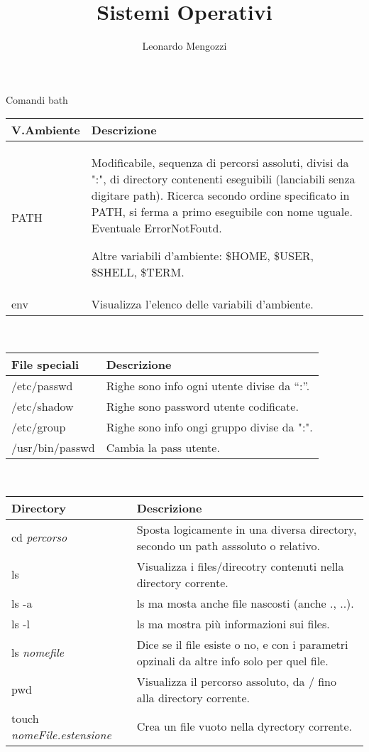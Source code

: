 \documentclass{article}
\title{Sistemi Operativi}
\author{Leonardo Mengozzi}
\date{}
\newcommand{\riga}[2]{
	#1 & #2\\
}
\newcommand{\tabella}[2]{
	\begin{tabularx}{\textwidth}{lX}
		\hline
		#1 & Descrizione\\
		\hline
		#2
		\hline
	\end{tabularx}
	\\[0.03\textheight]
}
\begin{document}
	\maketitle

	\centering
	{\large Comandi bath}\\[0.01\textheight]

	\tabella{V.Ambiente}{
		\riga{PATH}{Modificabile, sequenza di percorsi assoluti, divisi da ":", di directory contenenti eseguibili (lanciabili senza digitare path). Ricerca secondo ordine specificato in PATH, si ferma a primo eseguibile con nome uguale. Eventuale ErrorNotFoutd.

		Altre variabili d'ambiente: \$HOME, \$USER, \$SHELL, \$TERM.}
		\riga{env}{Visualizza l'elenco delle variabili d'ambiente.}
	}

	\tabella{File speciali}{
		\riga{/etc/passwd}{Righe sono info ogni utente divise da “:”.}
		\riga{/etc/shadow}{Righe sono password utente codificate.}
		\riga{/etc/group}{Righe sono info ongi gruppo divise da ":".}
		\riga{/usr/bin/passwd}{Cambia la pass utente.}
	}

	\tabella{Directory}{
		\riga{cd \textit{percorso}}{Sposta logicamente in una diversa directory, secondo un path asssoluto o relativo.}
		\riga{ls}{Visualizza i files/direcotry contenuti nella directory corrente.}
		\riga{ls -a}{ls ma mosta anche file nascosti (anche ., ..).}
		\riga{ls -l}{ls ma mostra più informazioni sui files.}
		\riga{ls \textit{nomefile}}{Dice se il file esiste o no, e con i parametri opzinali da altre info solo per quel file.}
		\riga{pwd}{Visualizza il percorso assoluto, da / fino alla directory corrente.}
		\riga{touch \textit{nomeFile.estensione}}{Crea un file vuoto nella dyrectory corrente.}
	}
\end{document}
